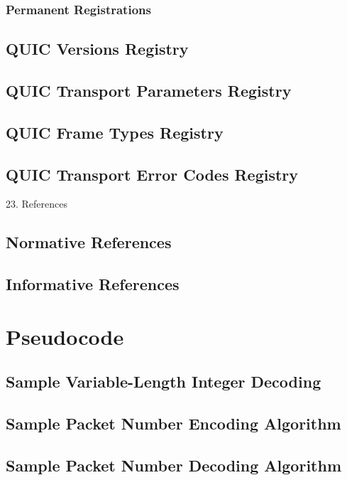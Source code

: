 \documentclass{article}
\begin{document}
\subsubsection{Permanent Registrations}

\subsection{QUIC Versions Registry}

\subsection{QUIC Transport Parameters Registry}

\subsection{QUIC Frame Types Registry}

\subsection{QUIC Transport Error Codes Registry}

23. References

\subsection{Normative References}

\subsection{Informative References}

\section{Pseudocode}

\subsection{Sample Variable-Length Integer Decoding}

\subsection{Sample Packet Number Encoding Algorithm}

\subsection{Sample Packet Number Decoding Algorithm}
\end{document}
